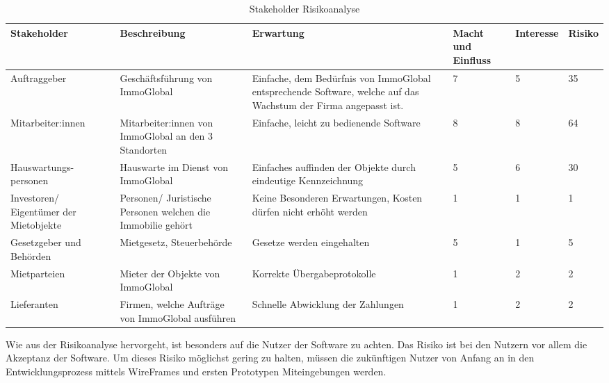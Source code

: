 \begin{table}[H]
  \centering
  \settowidth{}
  \setlength\extrarowheight{2pt}
  \begin{tabulary}{1.0\textwidth}{|L|L|L|a|z|y|}
    \hline
    \textbf{Stakeholder} & 
    \textbf{Beschreibung} & 
    \textbf{Erwartung}& 
    \textbf{Macht und Einfluss} & 
    \textbf{Interesse} & 
    \textbf{Risiko}\\
    \hline
    Auftraggeber & 
    Geschäftsführung von ImmoGlobal& 
    Einfache, dem Bedürfnis von ImmoGlobal entsprechende Software, welche auf das Wachstum der Firma angepasst ist. &
    7 &
    5 & 
    35\\ 
    \hline
    Mitarbeiter:innen & 
    Mitarbeiter:innen von ImmoGlobal an den 3 Standorten & 
    Einfache, leicht zu bedienende Software&
    8 &
    8 &
    64\\
    \hline
    Hauswartungs-personen & 
    Hauswarte im Dienst von ImmoGlobal &
    Einfaches auffinden der Objekte durch eindeutige Kennzeichnung &
    5 &
    6 &
    30 \\
    \hline
    Investoren/ Eigentümer der Mietobjekte & 
    Personen/ Juristische Personen welchen die Immobilie gehört &
    Keine Besonderen Erwartungen, Kosten dürfen nicht erhöht werden &
    1 &
    1 &
    1 \\
    \hline
    Gesetzgeber und Behörden &
    Mietgesetz, Steuerbehörde &
    Gesetze werden eingehalten &
    5 &
    1 &
    5 \\
    \hline
    Mietparteien & 
    Mieter der Objekte von ImmoGlobal &
    Korrekte Übergabeprotokolle &
    1 &
    2 &
    2 \\
    \hline
    Lieferanten & 
    Firmen, welche Aufträge von ImmoGlobal ausführen &
    Schnelle Abwicklung der Zahlungen &
    1 &
    2 &
    2 \\
    \hline
  \end{tabulary}
  \caption{Stakeholder Risikoanalyse}
  \label{tblRisikonalyse}
\end{table}

Wie aus der Risikoanalyse hervorgeht, ist besonders auf die Nutzer der Software zu achten. Das Risiko ist bei den Nutzern vor allem die Akzeptanz der Software. Um dieses Risiko möglichst gering zu halten, müssen die zukünftigen Nutzer von Anfang an in den Entwicklungsprozess mittels WireFrames und ersten Prototypen Miteingebungen werden.

